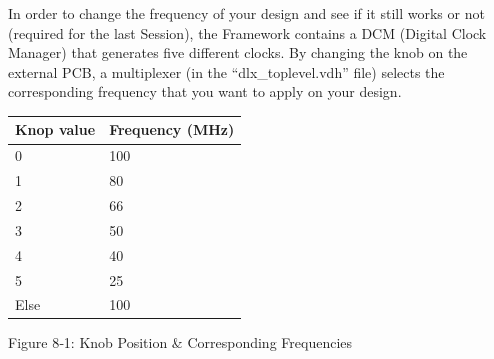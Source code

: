 \documentclass[
]{article}
\begin{document}
In order to change the frequency of your design and see if it still
works or not (required for the last Session), the Framework contains a
DCM (Digital Clock Manager) that generates five different clocks. By
changing the knob on the external PCB, a multiplexer (in the
``dlx\_toplevel.vdh'' file) selects the corresponding frequency that you
want to apply on your design.

\begin{longtable}[]{@{}ll@{}}
\toprule
Knop value & Frequency (MHz)\tabularnewline
\midrule
\endhead
0 & 100\tabularnewline
1 & 80\tabularnewline
2 & 66\tabularnewline
3 & 50\tabularnewline
4 & 40\tabularnewline
5 & 25\tabularnewline
Else & 100\tabularnewline
\bottomrule
\end{longtable}

Figure 8‑1: Knob Position \& Corresponding Frequencies
\end{document}
